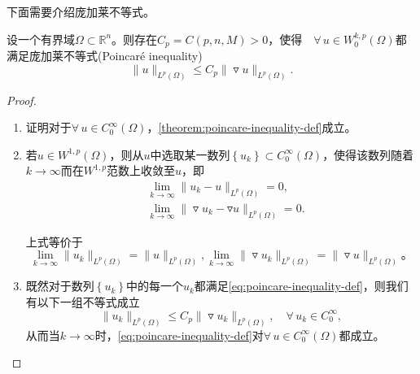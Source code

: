 下面需要介绍庞加莱不等式。
\begin{theorem}
  \label{theorem:poincare-inequality-def}
  设一个有界域$\Omega \subset \mathbb{R}^n$。则存在$C_p=C(p,n,M) > 0$，使得$\quad \forall \, u \in W_0^{k,p}(\Omega)$都满足庞加莱不等式(Poincaré inequality) 
  \begin{equation}
    \label{eq:poincare-inequality-def}
    \big\| u \big\| _{L^p(\Omega)} \le C_p \big\| \triangledown u \big\|_{L^p(\Omega)}.
  \end{equation}
\end{theorem}
\begin{proof}
  \begin{enumerate}
  \item 证明对于$\forall \, u \in C_0^{\infty}(\Omega)，$\eqref{theorem:poincare-inequality-def}成立。

  \item 若$u \in W^{1,p}(\Omega)$，则从$u$中选取某一数列$\left\{ u_k \right\} \subset C_0^{\infty}(\Omega)$，使得该数列随着$k \rightarrow \infty$而在$W^{1,p}$范数上收敛至$u$，即
  \begin{equation*}
\begin{split}
  &\lim_{k \rightarrow \infty} \big\| u_k - u \big\|_{L^p(\Omega)}  = 0, \\
  &\lim_{k \rightarrow \infty} \big\| \triangledown u_k - \triangledown u \big\|_{L^p(\Omega)} =0.
\end{split}
  \end{equation*}

上式等价于
\begin{subequations}
\begin{equation}
  \label{eq:poincare-inequality-uk-u}
\lim_{k \rightarrow \infty} \big\| u_k \big\|_{L^p(\Omega)}
= \big\| u \big\|_{L^p(\Omega)},
\end{equation}
\begin{equation}
  \label{eq:poincare-inequality-uk-u-delta}
\lim_{k \rightarrow \infty} \big\| \triangledown u_k \big\|_{L^p(\Omega)}
= \big\| \triangledown u \big\|_{L^p(\Omega)}。
\end{equation}
\end{subequations}

\item 既然对于数列$\left\{ u_k \right\}$中的每一个$u_k$都满足\eqref{eq:poincare-inequality-def}，则我们有以下一组不等式成立
\begin{equation*}
  \big\| u_k \big\| _{L^p(\Omega)} \le C_p \big\| \triangledown u_k \big\|_{L^p(\Omega)}, \quad \forall \, u_k \in C_0^{\infty},
\end{equation*}
从而当$k \rightarrow \infty$时，\eqref{eq:poincare-inequality-def}对$\forall \, u \in C_0^{\infty}(\Omega)$都成立。
\end{enumerate}


\end{proof}
